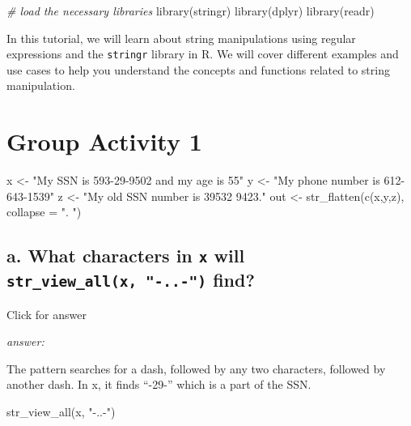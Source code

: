 \documentclass[
]{book}
\newenvironment{Shaded}{\begin{snugshade}}{\end{snugshade}}
\newcommand{\AttributeTok}[1]{\textcolor[rgb]{0.77,0.63,0.00}{#1}}
\newcommand{\CommentTok}[1]{\textcolor[rgb]{0.56,0.35,0.01}{\textit{#1}}}
\newcommand{\FunctionTok}[1]{\textcolor[rgb]{0.00,0.00,0.00}{#1}}
\newcommand{\NormalTok}[1]{#1}
\newcommand{\OtherTok}[1]{\textcolor[rgb]{0.56,0.35,0.01}{#1}}
\newcommand{\StringTok}[1]{\textcolor[rgb]{0.31,0.60,0.02}{#1}}
\begin{document}
\begin{Shaded}
\begin{Highlighting}[]
\CommentTok{\# load the necessary libraries}
\FunctionTok{library}\NormalTok{(stringr)}
\FunctionTok{library}\NormalTok{(dplyr)}
\FunctionTok{library}\NormalTok{(readr)}
\end{Highlighting}
\end{Shaded}

In this tutorial, we will learn about string manipulations using regular expressions and the \texttt{stringr} library in R. We will cover different examples and use cases to help you understand the concepts and functions related to string manipulation.

\hypertarget{group-activity-1}{%
\section{Group Activity 1}\label{group-activity-1}}

\begin{Shaded}
\begin{Highlighting}[]
\NormalTok{x }\OtherTok{\textless{}{-}} \StringTok{"My SSN is 593{-}29{-}9502 and my age is 55"}
\NormalTok{y }\OtherTok{\textless{}{-}} \StringTok{"My phone number is 612{-}643{-}1539"}
\NormalTok{z }\OtherTok{\textless{}{-}} \StringTok{"My old SSN number is 39532 9423."}
\NormalTok{out }\OtherTok{\textless{}{-}} \FunctionTok{str\_flatten}\NormalTok{(}\FunctionTok{c}\NormalTok{(x,y,z), }\AttributeTok{collapse =} \StringTok{". "}\NormalTok{)}
\end{Highlighting}
\end{Shaded}

\hypertarget{a.-what-characters-in-x-will-str_view_allx--..--find}{%
\subsection{\texorpdfstring{a. What characters in \texttt{x} will \texttt{str\_view\_all(x,\ "-..-")} find?}{a. What characters in x will str\_view\_all(x, "-..-") find?}}\label{a.-what-characters-in-x-will-str_view_allx--..--find}}

Click for answer

\emph{answer:}

The pattern searches for a dash, followed by any two characters, followed by another dash. In x, it finds ``-29-'' which is a part of the SSN.

\begin{Shaded}
\begin{Highlighting}[]
\FunctionTok{str\_view\_all}\NormalTok{(x, }\StringTok{"{-}..{-}"}\NormalTok{)}
\end{Highlighting}
\end{Shaded}
\end{document}
